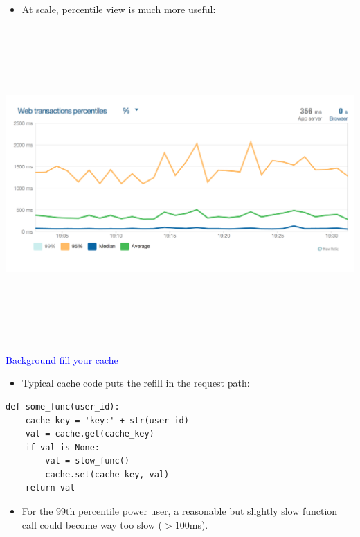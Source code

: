 \documentclass[landscape]{slides}
\begin{document}
\begin{slide}

    \begin{itemize}
        \item At scale, percentile view is much more useful:
    \end{itemize}

    \begin{center}
        \includegraphics[height=12cm]{web-transactions-2}
    \end{center}

\end{slide}


\begin{slide}

    \textcolor{blue}{\Large{Background fill your cache}}

    \begin{itemize}
        \item Typical cache code puts the refill in the request path:
    \end{itemize}

    \begin{lstlisting}
def some_func(user_id):
    cache_key = 'key:' + str(user_id)
    val = cache.get(cache_key)
    if val is None:
        val = slow_func()
        cache.set(cache_key, val)
    return val
    \end{lstlisting}

    \begin{itemize}
        \item For the 99th percentile power user, a reasonable but slightly slow function call could become way too slow ($>$100ms).
    \end{itemize}

\end{slide}
\end{document}
